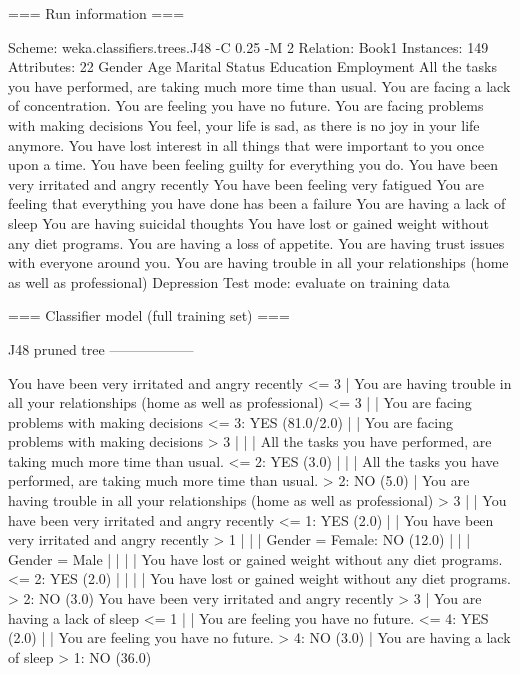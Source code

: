 === Run information ===

Scheme:       weka.classifiers.trees.J48 -C 0.25 -M 2
Relation:     Book1
Instances:    149
Attributes:   22
              Gender
              Age
              Marital Status
              Education
              Employment
              All the tasks you have performed, are taking much more time than usual.
              You are facing a lack of concentration.
              You are feeling you have no future.
              You are facing problems with making decisions
              You feel, your life is sad, as there is no joy in your life anymore.
              You have lost interest in all things that were important to you once upon a time.
              You have been feeling guilty for everything you do.
              You have been very irritated and angry recently
              You have been feeling very fatigued
              You are feeling that everything you have done has been a failure
              You are having a lack of sleep
              You are having suicidal thoughts
              You have lost or gained weight without any diet programs.
              You are having a loss of appetite.
              You are having trust issues with everyone around you.
              You are having trouble in all your relationships (home as well as professional)
              Depression
Test mode:    evaluate on training data

=== Classifier model (full training set) ===

J48 pruned tree
------------------

You have been very irritated and angry recently <= 3
|   You are having trouble in all your relationships (home as well as professional) <= 3
|   |   You are facing problems with making decisions <= 3: YES (81.0/2.0)
|   |   You are facing problems with making decisions > 3
|   |   |   All the tasks you have performed, are taking much more time than usual. <= 2: YES (3.0)
|   |   |   All the tasks you have performed, are taking much more time than usual. > 2: NO (5.0)
|   You are having trouble in all your relationships (home as well as professional) > 3
|   |   You have been very irritated and angry recently <= 1: YES (2.0)
|   |   You have been very irritated and angry recently > 1
|   |   |   Gender = Female: NO (12.0)
|   |   |   Gender = Male
|   |   |   |   You have lost or gained weight without any diet programs. <= 2: YES (2.0)
|   |   |   |   You have lost or gained weight without any diet programs. > 2: NO (3.0)
You have been very irritated and angry recently > 3
|   You are having a lack of sleep <= 1
|   |   You are feeling you have no future. <= 4: YES (2.0)
|   |   You are feeling you have no future. > 4: NO (3.0)
|   You are having a lack of sleep > 1: NO (36.0)

